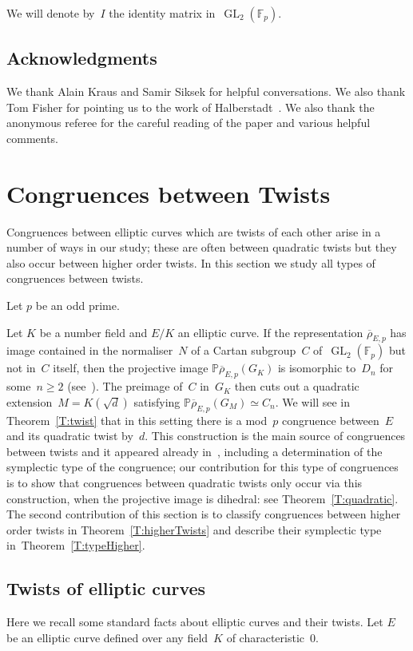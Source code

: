 \documentclass[12pt, reqno]{amsart}
\newcommand{\Fp}{\mathbb{F}_p}
\newcommand{\PP}{\mathbb{P}}
\newcommand{\rhobar}{{\overline{\rho}}}
\newcommand{\GL}{\operatorname{GL}}
\numberwithin{equation}{section}
\theoremstyle{definition}
\theoremstyle{remark}
\begin{document}
We will denote by~$I$ the identity matrix in~$\GL_2(\Fp)$.

\subsection{Acknowledgments} We thank Alain Kraus and Samir Siksek for helpful conversations. We also thank Tom Fisher for pointing 
us to the work of Halberstadt~\cite{Halberstadt-11nonsplit}. We also thank the anonymous referee for the careful reading of the paper and various helpful comments.

\section{Congruences between Twists}\label{S:cong-twist}

Congruences between elliptic curves which are twists of each other
arise in a number of ways in our study; these are often between
quadratic twists but they also occur between higher order twists. In
this section we study all types of congruences between twists.

Let $p$ be an odd prime.

Let $K$ be a number field and $E/K$ an elliptic curve. If the
representation $\rhobar_{E,p}$ has image contained in the
normaliser~$N$ of a Cartan subgroup~$C$ of~$\GL_2(\Fp)$ but not
in~$C$ itself, then the projective image $\PP \rhobar_{E,p}(G_K)$ is
isomorphic to~$D_{n}$ for some~$n \geq 2$
(see~\cite[Theorem~XI.2.3]{LangModForms}). The preimage of~$C$
in~$G_K$ then cuts out a quadratic extension~$M = K(\sqrt{d})$
satisfying $\PP \rhobar_{E,p}(G_M) \simeq C_n$.  We will see in
Theorem~\ref{T:twist} that in this setting there is a mod~$p$
congruence between~$E$ and its quadratic twist by~$d$. This
construction is the main source of congruences between twists and it
appeared already in~\cite[\S2]{Halberstadt-11nonsplit}, including a
determination of the symplectic type of the congruence; our
contribution for this type of congruences is to show that congruences
between quadratic twists only occur via this construction, when the
projective image is dihedral: see Theorem~\ref{T:quadratic}. The
second contribution of this section is to classify congruences between
higher order twists in Theorem~\ref{T:higherTwists} and describe
their symplectic type in~Theorem~\ref{T:typeHigher}.

\subsection{Twists of elliptic curves}
\label{S:twists}
Here we recall some standard facts about elliptic curves and their twists.
Let $E$ be an elliptic curve defined over any field~$K$ of
characteristic~$0$.
\end{document}
